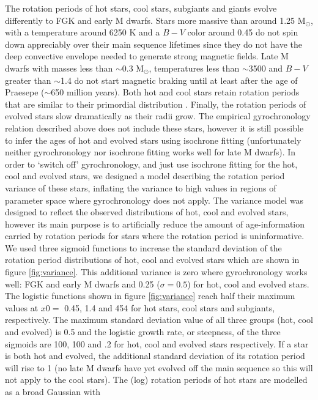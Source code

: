 The rotation periods of hot stars, cool stars, subgiants and giants evolve
differently to FGK and early M dwarfs.
Stars more massive than around 1.25 M$_\odot$, with a temperature around 6250
K and a $B-V$ color around 0.45 do not spin down appreciably over their main
sequence lifetimes since they do not have the deep convective envelope needed
to generate strong magnetic fields.
Late M dwarfs with masses less than $\sim$0.3 M$_\odot$, temperatures less
than $\sim$3500 and $B-V$ greater than $\sim$1.4 do not start magnetic braking
until at least after the age of Praesepe ($\sim$650 million years).
Both hot and cool stars retain rotation periods that are similar to their
primordial distribution \citep[see \eg][]{matt2012}.
Finally, the rotation periods of evolved stars slow dramatically as their
radii grow.
The empirical gyrochronology relation described above does not include these
stars, however it is still possible to infer the ages of hot and evolved stars
using isochrone fitting (unfortunately neither gyrochronology nor isochrone
fitting works well for late M dwarfs).
In order to `switch off' gyrochronology, and just use isochrone fitting for
the hot, cool and evolved stars, we designed a model describing the rotation
period variance of these stars, inflating the variance to high values in
regions of parameter space where gyrochronology does not apply.
The variance model was designed to reflect the observed distributions of hot,
cool and evolved stars, however its main purpose is to artificially reduce the
amount of age-information carried by rotation periods for stars where the
rotation period is uninformative.
We used three sigmoid functions to increase the standard deviation of the
rotation period distributions of hot, cool and evolved stars which are shown
in figure \ref{fig:variance}.
This additional variance is zero where gyrochronology works well: FGK and
early M dwarfs and 0.25 ($\sigma = 0.5$) for hot, cool and evolved stars.
The logistic functions shown in figure \ref{fig:variance} reach half their
maximum values at $x0 =$ 0.45, 1.4 and 454 for hot stars, cool stars and
subgiants, respectively.
The maximum standard deviation value of all three groups (hot, cool and
evolved) is 0.5 and the logistic growth rate, or steepness, of the three
sigmoids are 100, 100 and .2 for hot, cool and evolved stars respectively.
If a star is both hot and evolved, the additional standard deviation of its
rotation period will rise to 1 (no late M dwarfs have yet evolved off the main
sequence so this will not apply to the cool stars).
The (log) rotation periods of hot stars are modelled as a broad Gaussian with
